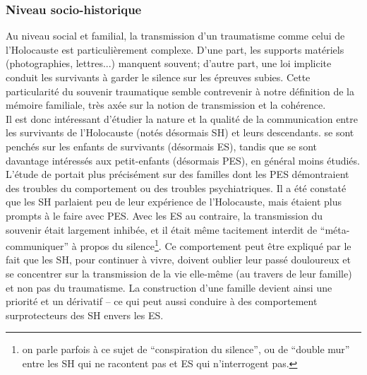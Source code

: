 \documentclass[french]{article}
\begin{document}
		\subsubsection{Niveau socio-historique}
			Au niveau social et familial, la transmission d'un traumatisme comme celui de l'Holocauste est particulièrement complexe. D'une part, les supports matériels (photographies, lettres...) manquent souvent; d'autre part, une loi implicite conduit les survivants à garder le silence sur les épreuves subies. Cette particularité du souvenir traumatique semble contrevenir à notre définition de la mémoire familiale, très axée sur la notion de transmission et la cohérence.\\
			
			Il est donc intéressant d'étudier la nature et la qualité de la communication entre les survivants de l'Holocauste (notés désormais SH) et leurs descendants. \cite{wiseman2006} se sont penchés sur les enfants de survivants (désormais ES), tandis que \cite{fossion2003} se sont davantage intéressés aux petit-enfants (désormais PES), en général moins étudiés. L'étude de \cite{fossion2003} portait plus précisément sur des familles dont les PES démontraient des troubles du comportement ou des troubles psychiatriques. Il a été constaté que les SH parlaient peu de leur expérience de l'Holocauste, mais étaient plus prompts à le faire avec PES. Avec les ES au contraire, la transmission du souvenir était largement inhibée, et il était même tacitement interdit de ``méta-communiquer'' à propos du silence\footnote{on parle parfois à ce sujet de ``conspiration du silence'', ou de ``double mur'' entre les SH qui ne racontent pas et ES qui n'interrogent pas.}. Ce comportement peut être expliqué par le fait que les SH, pour continuer à vivre, doivent oublier leur passé douloureux et se concentrer sur la transmission de la vie elle-même (au travers de leur famille) et non pas du traumatisme. La construction d'une famille devient ainsi une priorité et un dérivatif -- ce qui peut aussi conduire à des comportement surprotecteurs des SH envers les ES.\\
			
\end{document}
